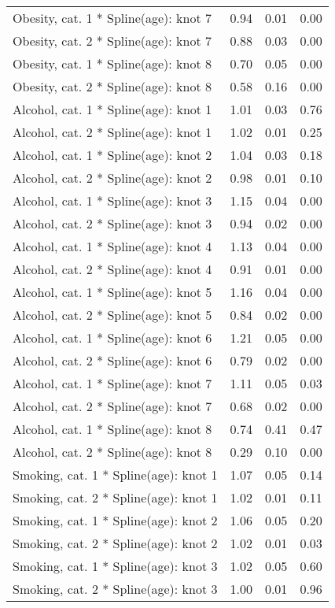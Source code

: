 \documentclass{article}
\begin{document}
\begin{longtable}{lrrr}
Obesity, cat. 1 * Spline(age): knot 7 & 0.94 & 0.01 & 0.00 \\ 
Obesity, cat. 2 * Spline(age): knot 7 & 0.88 & 0.03 & 0.00 \\ 
Obesity, cat. 1 * Spline(age): knot 8 & 0.70 & 0.05 & 0.00 \\ 
Obesity, cat. 2 * Spline(age): knot 8 & 0.58 & 0.16 & 0.00 \\ 
Alcohol, cat. 1 * Spline(age): knot 1 & 1.01 & 0.03 & 0.76 \\ 
Alcohol, cat. 2 * Spline(age): knot 1 & 1.02 & 0.01 & 0.25 \\ 
Alcohol, cat. 1 * Spline(age): knot 2 & 1.04 & 0.03 & 0.18 \\ 
Alcohol, cat. 2 * Spline(age): knot 2 & 0.98 & 0.01 & 0.10 \\ 
Alcohol, cat. 1 * Spline(age): knot 3 & 1.15 & 0.04 & 0.00 \\ 
Alcohol, cat. 2 * Spline(age): knot 3 & 0.94 & 0.02 & 0.00 \\ 
Alcohol, cat. 1 * Spline(age): knot 4 & 1.13 & 0.04 & 0.00 \\ 
Alcohol, cat. 2 * Spline(age): knot 4 & 0.91 & 0.01 & 0.00 \\ 
Alcohol, cat. 1 * Spline(age): knot 5 & 1.16 & 0.04 & 0.00 \\ 
Alcohol, cat. 2 * Spline(age): knot 5 & 0.84 & 0.02 & 0.00 \\ 
Alcohol, cat. 1 * Spline(age): knot 6 & 1.21 & 0.05 & 0.00 \\ 
Alcohol, cat. 2 * Spline(age): knot 6 & 0.79 & 0.02 & 0.00 \\ 
Alcohol, cat. 1 * Spline(age): knot 7 & 1.11 & 0.05 & 0.03 \\ 
Alcohol, cat. 2 * Spline(age): knot 7 & 0.68 & 0.02 & 0.00 \\ 
Alcohol, cat. 1 * Spline(age): knot 8 & 0.74 & 0.41 & 0.47 \\ 
Alcohol, cat. 2 * Spline(age): knot 8 & 0.29 & 0.10 & 0.00 \\ 
Smoking, cat. 1 * Spline(age): knot 1 & 1.07 & 0.05 & 0.14 \\ 
Smoking, cat. 2 * Spline(age): knot 1 & 1.02 & 0.01 & 0.11 \\ 
Smoking, cat. 1 * Spline(age): knot 2 & 1.06 & 0.05 & 0.20 \\ 
Smoking, cat. 2 * Spline(age): knot 2 & 1.02 & 0.01 & 0.03 \\ 
Smoking, cat. 1 * Spline(age): knot 3 & 1.02 & 0.05 & 0.60 \\ 
Smoking, cat. 2 * Spline(age): knot 3 & 1.00 & 0.01 & 0.96 \\ 

\end{longtable}
\end{document}
